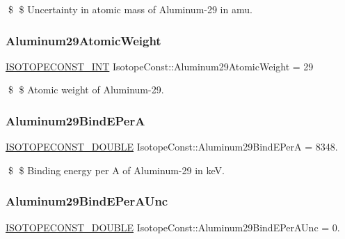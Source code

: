 \$ \$ Uncertainty in atomic mass of Aluminum-\/29 in amu. \mbox{\label{group___isotope_const-_aluminum-_al29_ga8876b50c495608e0722c33875607af84}} 
\subsubsection{\texorpdfstring{Aluminum29\+Atomic\+Weight}{Aluminum29AtomicWeight}}
{\footnotesize\ttfamily \mbox{\hyperlink{group___isotope_const-_macros_ga5f18360b3e99483a35c32d789e62621c}{I\+S\+O\+T\+O\+P\+E\+C\+O\+N\+S\+T\+\_\+\+I\+NT}} Isotope\+Const\+::\+Aluminum29\+Atomic\+Weight = 29}

\$ \$ Atomic weight of Aluminum-\/29. \mbox{\label{group___isotope_const-_aluminum-_al29_gacae6786fe77afa4a9f016c0f16ef28ce}} 
\subsubsection{\texorpdfstring{Aluminum29\+Bind\+E\+PerA}{Aluminum29BindEPerA}}
{\footnotesize\ttfamily \mbox{\hyperlink{group___isotope_const-_macros_ga8f45a7272ce02c0b4c65c44636ed719a}{I\+S\+O\+T\+O\+P\+E\+C\+O\+N\+S\+T\+\_\+\+D\+O\+U\+B\+LE}} Isotope\+Const\+::\+Aluminum29\+Bind\+E\+PerA = 8348.}

\$ \$ Binding energy per A of Aluminum-\/29 in keV. \mbox{\label{group___isotope_const-_aluminum-_al29_ga9bd2dcebfc72c9f46a85939b3d659809}} 
\subsubsection{\texorpdfstring{Aluminum29\+Bind\+E\+Per\+A\+Unc}{Aluminum29BindEPerAUnc}}
{\footnotesize\ttfamily \mbox{\hyperlink{group___isotope_const-_macros_ga8f45a7272ce02c0b4c65c44636ed719a}{I\+S\+O\+T\+O\+P\+E\+C\+O\+N\+S\+T\+\_\+\+D\+O\+U\+B\+LE}} Isotope\+Const\+::\+Aluminum29\+Bind\+E\+Per\+A\+Unc = 0.}


